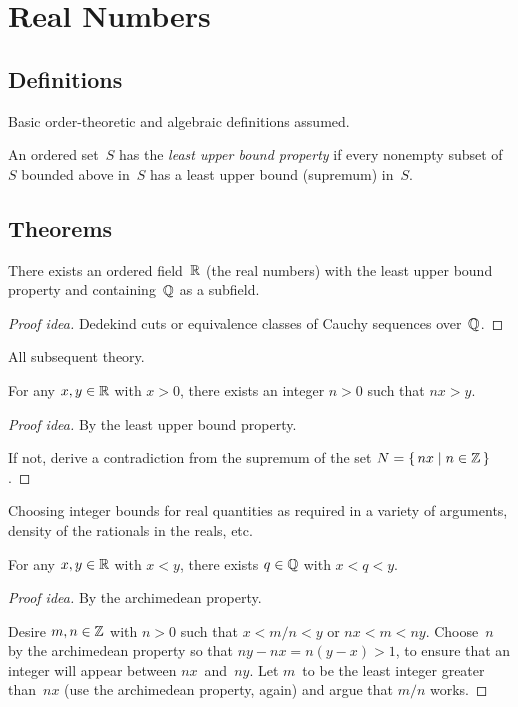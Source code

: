 %
%
%
\section{Real Numbers}
\subsection*{Definitions}
Basic order-theoretic and algebraic definitions assumed.

\begin{defn}
An ordered set~\(S\) has the \emph{least upper bound property} if every nonempty subset of~\(S\) bounded above in~\(S\) has a least upper bound (supremum) in~\(S\).
\end{defn}

\subsection*{Theorems}
\begin{thm}[Existence of~\(\R\)]
There exists an ordered field~\(\R\) (the real numbers) with the least upper bound property and containing~\(\Q\) as a subfield.
\end{thm}
\begin{proof}[Proof idea]
Dedekind cuts or equivalence classes of Cauchy sequences over~\(\Q\).
\end{proof}
\begin{app}
All subsequent theory.
\end{app}

\begin{thm}
For any \(x,y\in\mathbb{R}\) with \(x>0\), there exists an integer \(n>0\) such that \(nx>y\).
\end{thm}
\begin{proof}[Proof idea]
By the least upper bound property.

If not, derive a contradiction from the supremum of the set \(N=\{\,nx\mid n\in\mathbb{Z}\,\}\).
\end{proof}
\begin{app}
Choosing integer bounds for real quantities as required in a variety of arguments, density of the rationals in the reals, etc.
\end{app}

\begin{thm}[Density of~\(\Q\) in~\(\R\)]
For any \(x,y\in\mathbb{R}\) with \(x<y\), there exists \(q\in\mathbb{Q}\) with \(x<q<y\).
\end{thm}
\begin{proof}[Proof idea]
By the archimedean property.

Desire \(m,n\in\mathbb{Z}\) with \(n>0\) such that \(x<m/n<y\) or \(nx<m<ny\). Choose~\(n\) by the archimedean property so that \(ny-nx=n(y-x)>1\), to ensure that an integer will appear between \(nx\)~and~\(ny\). Let \(m\)~to be the least integer greater than~\(nx\) (use the archimedean property, again) and argue that \(m/n\) works.
\end{proof}

